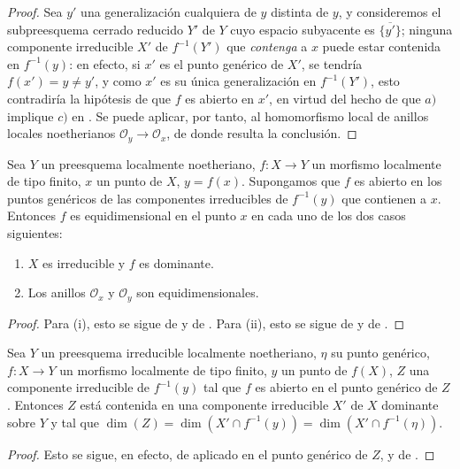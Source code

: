 \begin{proof}
Sea $y'$ una generalización cualquiera de $y$ distinta de $y$, y consideremos el subpreesquema cerrado reducido $Y'$ de $Y$ cuyo espacio subyacente es $\overline{\{y'\}}$; ninguna componente irreducible $X'$ de $f^{-1}(Y')$ que \emph{contenga} a $x$ puede estar contenida en $f^{-1}(y)$: en efecto, si $x'$ es el punto genérico de $X'$, se tendría $f(x')=y\ne y'$, y como $x'$ es su única generalización en $f^{-1}(Y')$, esto contradiría la hipótesis de que $f$ es abierto en $x'$, en virtud del hecho de que $a)$ implique $c)$ en .
Se puede aplicar, por tanto,  al homomorfismo local de anillos locales noetherianos $\mathcal O_y\to\mathcal O_x$, de donde resulta la conclusión.
\end{proof}

\begin{corollary}[14.2.2]
\label{IV.14.2.2}
Sea $Y$ un preesquema localmente noetheriano, $f:X\to Y$ un morfismo localmente de tipo finito, $x$ un punto de $X$, $y=f(x)$.
Supongamos que $f$ es abierto en los puntos genéricos de las componentes irreducibles de $f^{-1}(y)$ que contienen a $x$.
Entonces $f$ es equidimensional en el punto $x$ en cada uno de los dos casos siguientes:
\begin{enumerate}[label=(\roman*)]
  \item $X$ es irreducible y $f$ es dominante.
  \item Los anillos $\mathcal O_x$ y $\mathcal O_y$ son equidimensionales.
\end{enumerate}
\end{corollary}

\begin{proof}
Para (i), esto se sigue de  y de .
Para (ii), esto se sigue de  y de .
\end{proof}

\begin{proposition}[14.2.3]
\label{IV.14.2.3}
Sea $Y$ un preesquema irreducible localmente noetheriano, $\eta$ su punto genérico, $f:X\to Y$ un morfismo localmente de tipo finito, $y$ un punto de $f(X)$, $Z$ una componente irreducible de $f^{-1}(y)$ tal que $f$ es abierto en el punto genérico de $Z$.
Entonces $Z$ está contenida en una componente irreducible $X'$ de $X$ dominante sobre $Y$ y tal que $\dim(Z)=\dim(X'\cap f^{-1}(y))=\dim(X'\cap f^{-1}(\eta))$.
\end{proposition}

\begin{proof}
Esto se sigue, en efecto, de  aplicado en el punto genérico de $Z$, y de .
\end{proof}

